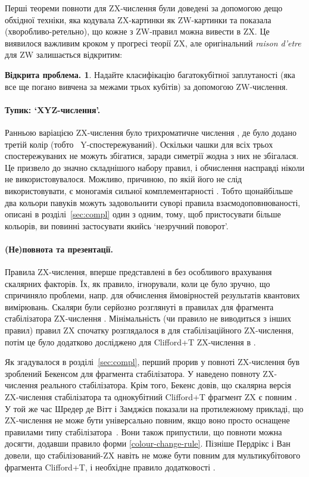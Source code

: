 \documentclass[11pt]{article}
\theoremstyle{definition}
\newtheorem{open}[theorem]{Відкрита проблема.}
\begin{document}
{Перші теореми повноти для ZX-числення були доведені за допомогою дещо обхідної техніки, яка кодувала ZX-картинки як ZW-картинки та показала (хворобливо-ретельно), що кожне з ZW-правил можна вивести в ZX. Це виявилося важливим кроком у прогресі теорії ZX, але оригінальний \textit{raison d'etre} для ZW залишається відкритим:

\begin{open}
  Надайте класифікацію багатокубітної заплутаності (яка все ще погано вивчена за межами трьох кубітів) за допомогою ZW-числення.
\end{open} 

\paragraph{Тупик: `XYZ-числення'.} Ранньою варіацією ZX-числення було трихроматичне числення \cite{LangC2}, де було додано третій колір (тобто ~Y-спостережуваний). Оскільки чашки для всіх трьох спостережуваних не можуть збігатися, заради симетрії жодна з них не збігалася. Це призвело до значно складнішого набору правил, і обчислення насправді ніколи не використовувалося. Можливо, причиною, по якій його не слід використовувати, є моногамія сильної комплементарності \cite{CKbook}. Тобто щонайбільше два кольори павуків можуть задовольнити суворі правила взаємодоповнюваності, описані в розділі~\ref{sec:compl} один з одним, тому, щоб пристосувати більше кольорів, ви повинні застосувати якийсь `незручний поворот'.

\paragraph{(Не)повнота та презентації.}
Правила ZX-числення, вперше представлені в \cite{CD2} без особливого врахування скалярних факторів. Їх, як правило, ігнорували, коли це було зручно, що спричиняло проблеми, напр. для обчислення ймовірностей результатів квантових вимірювань. Скаляри були серйозно розглянуті в правилах для фрагмента стабілізатора ZX-числення \cite{backens_making_2015}. Мінімальність (чи правило не виводиться з інших правил) правил ZX спочатку розглядалося в \cite{bpw2020} для стабілізаційного ZX-числення, потім це було додатково досліджено для Clifford+T ZX-числення в \cite{BorunMSc}.

Як згадувалося в розділі~\ref{sec:compl}, перший прорив у повноті ZX-числення був зроблений Бекенсом \cite{Backens} для фрагмента стабілізатора. У \cite{perdrixpivoting} наведено повноту ZX-числення реального стабілізатора. Крім того, Бекенс довів, що скалярна версія ZX-числення стабілізатора та однокубітний Clifford+T фрагмент ZX є повним \cite{backens_making_2015, Backens2}. У той же час Шредер де Вітт і Замджієв показали на протилежному прикладі, що ZX-числення не може бути універсально повним, якщо воно просто оснащене правилами типу стабілізатора~\cite{Vladimir}. Вони також припустили, що повноти можна досягти, додавши правило форми
\eqref{colour-change-rule}. Пізніше Пердрікс і Ван довели, що стабілізований-ZX навіть не може бути повним для мультикубітового фрагмента Clifford+T, і необхідне правило додатковості \cite{PerdrixWang}.

}
\end{document}
